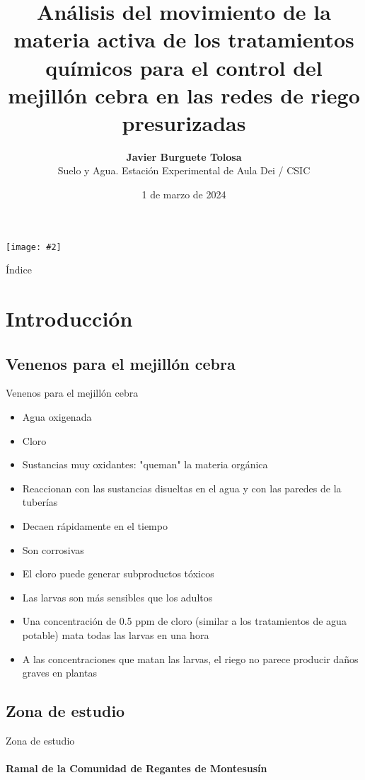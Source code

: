 \documentclass[pdr]{beamer}
\title[Análisis de los tratamientos químicos para el control del mejillón cebra
	en redes de riego presurizadas]
{Análisis del movimiento de la materia activa de los tratamientos químicos para
el control del mejillón cebra en las redes de riego presurizadas}
\author[{\bfseries Javier Burguete}\\Estación Experimental de Aula Dei / CSIC]
{{\bfseries Javier Burguete Tolosa}\\
	Suelo y Agua. Estación Experimental de Aula Dei / CSIC}
\date{1 de marzo de 2024}
\newcommand{\FIGURE}[2]
{
	\begin{center}
		\texttt{[image: \#2]}
	\end{center}
}
\begin{document}
\begin{frame}
	\begin{titlepage}
		\centering
		\FIGURE{0.8\textwidth}{Logos.pdf}
	\end{titlepage}
\end{frame}

\begin{frame}{Índice}
	\tableofcontents
\end{frame}

\section{Introducción}

\subsection{Venenos para el mejillón cebra}

\begin{frame}{Venenos para el mejillón cebra}
	\begin{itemize}
		\item Agua oxigenada
		\item Cloro
		\item Sustancias muy oxidantes: "queman" la materia orgánica
		\item Reaccionan con las sustancias disueltas en el agua y con
			las paredes de la tuberías
		\item Decaen rápidamente en el tiempo
		\item Son corrosivas
		\item El cloro puede generar subproductos tóxicos
		\item Las larvas son más sensibles que los adultos
		\item Una concentración de 0.5 ppm de cloro (similar a los
			tratamientos de agua potable) mata todas las larvas en
			una hora
		\item A las concentraciones que matan las larvas, el riego no
			parece producir daños graves en plantas
	\end{itemize}
\end{frame}

\subsection{Zona de estudio}

\begin{frame}{Zona de estudio}
	\framesubtitle{Ramal de la Comunidad de Regantes de Montesusín}
\end{frame}
\end{document}
